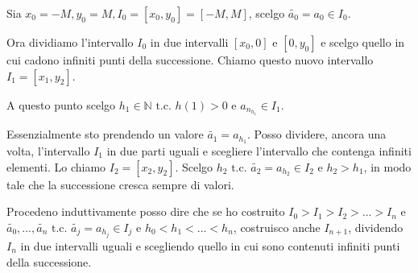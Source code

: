 \begin{dimostration}
    Sia $x_0=-M, y_0=M, I_0=[x_0,y_0]=[-M,M]$, scelgo $\widetilde{a_0}=a_0\in I_0$.
    
    \begin{center}
\end{center}

Ora dividiamo l'intervallo $I_0$ in due intervalli $[x_0, 0]\text{ e }[0,y_0]$ e scelgo quello in cui cadono infiniti punti della successione. Chiamo questo nuovo intervallo $I_1=[x_1,y_2]$.

A questo punto scelgo $h_1\in\mathbb{N}\text{ t.c. }h(1)>0\text{ e }a_{n_{h_1}}\in I_1$.

Essenzialmente sto prendendo un valore $\widetilde{a_1}=a_{h_1}$.
Posso dividere, ancora una volta, l'intervallo $I_1$ in due parti uguali e scegliere l'intervallo che contenga infiniti elementi. Lo chiamo $I_2=[x_2,y_2]$. Scelgo $h_2\text{ t.c. }\widetilde{a_2}=a_{h_2}\in I_2\text{ e }h_2>h_1$, in modo tale che la successione cresca sempre di valori.

Procedeno induttivamente posso dire che se ho costruito $I_0>I_1>I_2>\text{...}>I_n$ e $\widetilde{a_0},\text{...},\widetilde{a_n}\text{ t.c. }\widetilde{a_j}=a_{h_j}\in I_j$ e $h_0<h_1<\text{...}<h_n$, costruisco anche $I_{n+1}$, dividendo $I_n$ in due intervalli uguali e scegliendo quello in cui sono contenuti infiniti punti della successione.


\end{dimostration}
